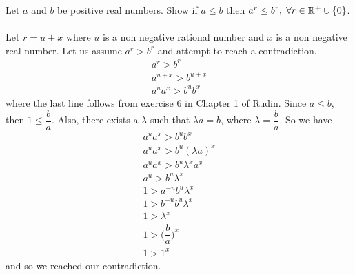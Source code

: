 \documentclass[12pt]{article}
\begin{document}
\problem 
Let $a$ and $b$ be positive real numbers. Show if $a \leq b$ then $a^{r} \leq b^{r}, \; \forall r \in \mathbb{R}^{+} \cup \left\{0\right\}$. \\ \\
Let $r=u+x$ where $u$ is a non negative rational number and $x$ is a non negative real number. Let us assume $a^{r} > b^{r}$ and attempt to reach a contradiction.
\begin{align*}
a^{r} > b^{r} \\
a^{u+x} > b^{u+x} \\
a^{u}a^{x} > b^{u}b^{x}
\end{align*}
where the last line follows from exercise 6 in Chapter 1 of Rudin. Since $a \leq b$, then $1 \leq \dfrac{b}{a}$. Also, there exists a $\lambda$ such that $\lambda a = b$, where $\lambda = \dfrac{b}{a}$. So we have
\begin{align*}
a^{u}a^{x} > b^{u}b^{x} \\ 
a^{u}a^{x} > b^{u}(\lambda a)^{x} \\
a^{u}a^{x} > b^{u} \lambda^{x} a^{x} \\
a^{u} > b^{u} \lambda^{x} \\ 
1 > a^{-u}  b^{u} \lambda^{x} \\
1 >  b^{-u}b^{u} \lambda^{x} \\
1 >\lambda^{x} \\
1 > \Big(\dfrac{b}{a} \Big)^{x} \\
1 > 1^{x} 
\end{align*} 
and so we reached our contradiction. 
\end{document}
